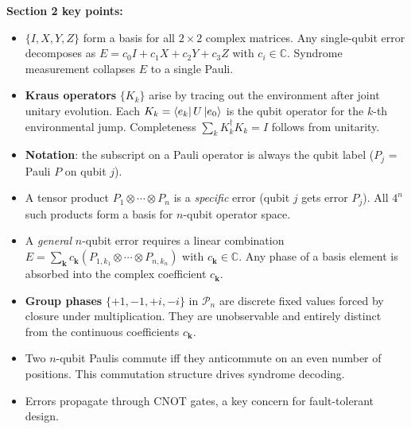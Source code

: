 \documentclass[11pt, a4paper]{article}
\theoremstyle{definition}
\theoremstyle{plain}
\theoremstyle{remark}
\begin{document}
\begin{summarybox}
\textbf{Section 2 key points:}
\begin{itemize}
  \item $\{I,X,Y,Z\}$ form a basis for all $2\times2$ complex matrices.
        Any single-qubit error decomposes as
        $E = c_0 I + c_1 X + c_2 Y + c_3 Z$ with $c_i \in \mathbb{C}$.
        Syndrome measurement collapses $E$ to a single Pauli.

  \item \textbf{Kraus operators} $\{K_k\}$ arise by tracing out the
        environment after joint unitary evolution.  Each $K_k = \bra{e_k}U\ket{e_0}$
        is the qubit operator for the $k$-th environmental jump.
        Completeness $\sum_k K_k^\dagger K_k = I$ follows from unitarity.

  \item \textbf{Notation}: the subscript on a Pauli operator is always the
        qubit label ($P_j$ = Pauli $P$ on qubit $j$).

  \item A tensor product $P_1\otimes\cdots\otimes P_n$ is a
        \emph{specific} error (qubit $j$ gets error $P_j$).  All $4^n$
        such products form a basis for $n$-qubit operator space.

  \item A \emph{general} $n$-qubit error requires a linear combination
        $E = \sum_\mathbf{k} c_\mathbf{k}(P_{1,k_1}\otimes\cdots\otimes P_{n,k_n})$
        with $c_\mathbf{k}\in\mathbb{C}$.  Any phase of a basis element is
        absorbed into the complex coefficient $c_\mathbf{k}$.

  \item \textbf{Group phases} $\{+1,-1,+i,-i\}$ in $\mathcal{P}_n$ are
        discrete fixed values forced by closure under multiplication.
        They are unobservable and entirely distinct from the continuous
        coefficients $c_\mathbf{k}$.

  \item Two $n$-qubit Paulis commute iff they anticommute on an even
        number of positions.  This commutation structure drives syndrome
        decoding.

  \item Errors propagate through CNOT gates, a key concern for
        fault-tolerant design.
\end{itemize}
\end{summarybox}
\end{document}
